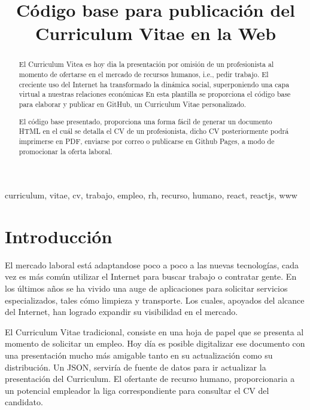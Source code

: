 \documentclass[conference]{IEEEtran}
\begin{document}
  \title{Código base para publicación del Curriculum Vitae en la Web}

  \author{
  }

  \maketitle

  \begin{abstract}
    El Curriculum Vitea es hoy dia la presentación por omisión de un profesionista al momento de ofertarse en el mercado de recursos humanos, i.e., pedir trabajo. El creciente uso del Internet ha transformado la dinámica social, superponiendo una capa virtual a nuestras relaciones económicas
    En esta plantilla se proporciona el código base para elaborar y publicar en GitHub, un Curriculum Vitae personalizado.

    El código base presentado, proporciona una forma fácil de generar un documento HTML en el cuál se detalla el CV de un profesionista, dicho CV posteriormente podrá imprimerse en PDF, enviarse por correo o publicarse en Github Pages, a modo de promocionar la oferta laboral.
  \end{abstract}

  \begin{IEEEkeywords}
    curriculum, vitae, cv, trabajo, empleo, rh, recurso, humano, react, reactjs, www
  \end{IEEEkeywords}

  \section{Introducción}
    El mercado laboral está adaptandose poco a poco a las nuevas tecnologías, cada vez es más común utilizar el Internet para buscar trabajo o contratar gente. En los últimos años se ha vivido una auge de aplicaciones para solicitar servicios especializados, tales cómo limpieza y transporte. Los cuales, apoyados del alcance del Internet, han logrado expandir su visibilidad en el mercado.

    El Curriculum Vitae tradicional, consiste en una hoja de papel que se presenta al momento de solicitar un empleo. Hoy día es posible digitalizar ese documento con una presentación mucho más amigable tanto en su actualización como su distribución. Un JSON, serviría de fuente de datos para ir actualizar la presentación del Curriculum. El ofertante de recurso humano, proporcionaria a un potencial empleador la liga correspondiente para consultar el CV del candidato.
\end{document}
